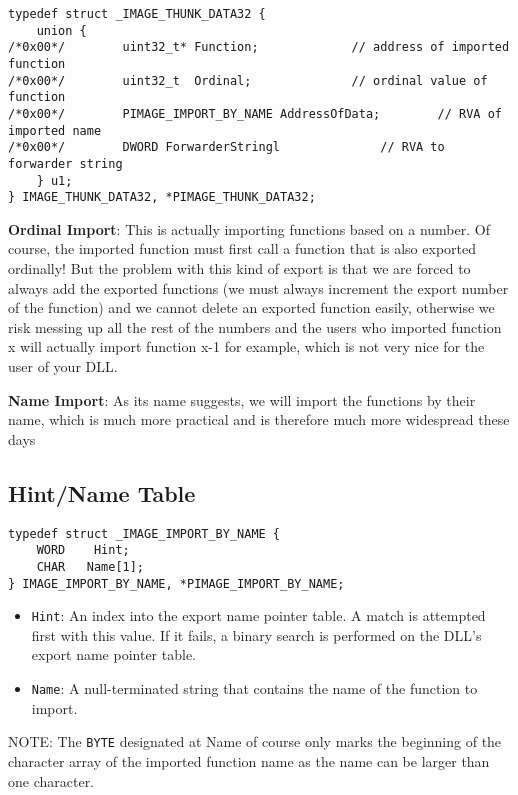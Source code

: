 \begin{verbatim}
typedef struct _IMAGE_THUNK_DATA32 {
    union {
/*0x00*/        uint32_t* Function;             // address of imported function
/*0x00*/        uint32_t  Ordinal;              // ordinal value of function
/*0x00*/        PIMAGE_IMPORT_BY_NAME AddressOfData;        // RVA of imported name
/*0x00*/        DWORD ForwarderStringl              // RVA to forwarder string
    } u1;
} IMAGE_THUNK_DATA32, *PIMAGE_THUNK_DATA32;
\end{verbatim}

{\bf Ordinal Import}:
This is actually importing functions based on a number. Of course, the imported function must first call a function that is also exported ordinally! But the problem with this kind of export is that we are forced to always add the exported functions (we must always increment the export number of the function) and we cannot delete an exported function easily, otherwise we risk messing up all the rest of the numbers and the users who imported function x will actually import function x-1 for example, which is not very nice for the user of your DLL.

{\bf Name Import}:
As its name suggests, we will import the functions by their name, which is much more practical and is therefore much more widespread these days

\subsection{Hint/Name Table}

\begin{verbatim}
typedef struct _IMAGE_IMPORT_BY_NAME {
    WORD    Hint;
    CHAR   Name[1];
} IMAGE_IMPORT_BY_NAME, *PIMAGE_IMPORT_BY_NAME;    
\end{verbatim}

\begin{itemize}
    \item \verb+Hint+: An index into the export name pointer table. A match is attempted first with this value. If it fails, a binary search is performed on the DLL's export name pointer table. 
    \item \verb+Name+: A null-terminated string that contains the name of the function to import.
\end{itemize}

NOTE: The \verb+BYTE+ designated at Name of course only marks the beginning of the character array of the imported function name as the name can be larger than one character.

